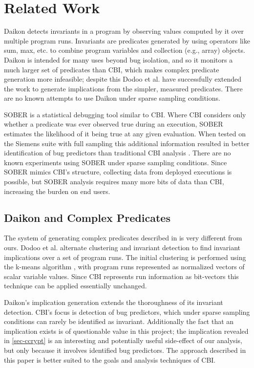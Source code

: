 
\section{Related Work}
\label{sec-rw}
Daikon \cite{ErnstPGMPTX2006} detects invariants in a program by observing values computed by it over multiple program runs.  Invariants are predicates generated by using operators like sum, max, etc. to combine program variables and collection (e.g., array) objects.  Daikon is intended for many uses beyond bug isolation, and so it monitors a much larger set of predicates than CBI, which makes complex predicate generation more infeasible; despite this Dodoo et al. \cite{ErnstDRAFT} have successfully extended the work to generate implications from the simpler, measured predicates.  There are no known attempts to use Daikon under sparse sampling conditions.

SOBER \cite{1081753} is a statistical debugging tool similar to CBI.  Where CBI considers only whether a predicate was ever observed true during an execution, SOBER estimates the likelihood of it being true at any given evaluation.  When tested on the Siemens suite with full sampling this additional information resulted in better identification of bug predictors than traditional CBI analysis \cite{1081753}.  There are no known experiments using SOBER under sparse sampling conditions.  Since SOBER mimics CBI's structure, collecting data from deployed executions is possible, but SOBER analysis requires many more bits of data than CBI, increasing the burden on end users.

\subsection{Daikon and Complex Predicates}
\label{sec-daikon}
The system of generating complex predicates described in \cite{ErnstDRAFT} is very different from ours.  Dodoo et al. alternate clustering and invariant detection to find invariant implications over a set of program runs.  The initial clustering is performed using the k-means algorithm \cite{jain99data}, with program runs represented as normalized vectors of scalar variable values.  Since CBI represents run information as bit-vectors this technique can be applied essentially unchanged.

Daikon's implication generation extends the thoroughness of its invariant detection.  CBI's focus is detection of bug predictors, which under sparse sampling conditions can rarely be identified as invariant.  Additionally the fact that an implication exists is of questionable value in this project; the implication revealed in \autoref{sec-ccrypt} is an interesting and potentially useful side-effect of our analysis, but only because it involves identified bug predictors.  The approach described in this paper is better suited to the goals and analysis techniques of CBI.


